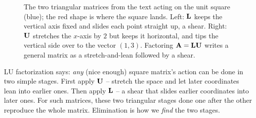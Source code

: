 \begin{figure}[H]
\centering
{}
\caption{The two triangular matrices from the text acting on the unit square (blue); the
red shape is where the square lands. Left: $\mathbf{L}$ keeps the vertical axis fixed and slides
each point straight up, a shear. Right: $\mathbf{U}$ stretches the $x$-axis by $2$ but keeps it
horizontal, and tips the vertical side over to the vector $(1,3)$. Factoring
$\mathbf{A}=\mathbf{L}\mathbf{U}$ writes a general matrix as a stretch-and-lean followed by a shear.}
\label{ch09:fig-triangular}
\end{figure}

\begin{intuitionbox}
LU factorization says: \emph{any} (nice enough) square matrix's action can be done in two
simple stages. First apply $\mathbf{U}$ -- stretch the space and let later coordinates lean
into earlier ones. Then apply $\mathbf{L}$ -- a shear that slides earlier coordinates into
later ones. For such matrices, these two triangular stages done one after the other
reproduce the whole matrix. Elimination is how we \emph{find} the two stages.
\end{intuitionbox}

